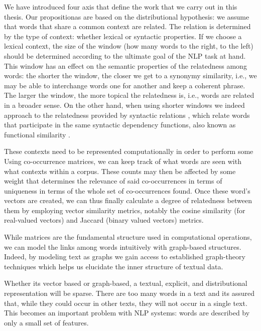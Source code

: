 We have introduced four axis that define the work that we carry out in this thesis. Our propositionas are based on the distributional hypothesis: we assume that words that share a common context are related. The relation is determined by the type of context: whether lexical or syntactic properties. If we choose a lexical context, the size of the window (how many words to the right, to the left) should be determined according to the ultimate goal of the NLP task at hand. This window has an effect on the semantic properties of the relatedness among words: the shorter the window, the closer we get to a synonymy similarity, i.e., we may be able to interchange words one for another and keep a coherent phrase. The larger the window, the more topical the relatedness is, i.e., words are related in a broader sense. On the other hand, when using shorter windows we indeed approach to the relatedness provided by syntactic relations \cite{sahlgren2006word}, which relate words that participate in the same syntactic dependency functions, also known as functional similarity \cite{LevyG14}. %

These contexts need to be represented computationally in order to perform some Using co-occurrence matrices, we can keep track of what words are seen with what contexts within a corpus. These counts may then be affected by some weight that determines the relevance of said co-occurrences in terms of uniqueness in terms of the whole set of co-occurrences found. Once these word's vectors are created, we can thus finally calculate a degree of relatedness between them by employing vector similarity metrics, notably the cosine similarity (for real-valued vectors) and Jaccard (binary valued vectors) metrics.

While matrices are the fundamental structure used in computational operations, we can model the links among words intuitively with graph-based structures. Indeed, by modeling text as graphs we gain access to  established graph-theory techniques which helps us elucidate the inner structure of textual data. 	

Whether its vector based or graph-based, a textual, explicit, and distributional representation will be sparse. There are too many words in a text and its assured that, while they could occur in other texts, they will not occur in a single text. This becomes an important problem with NLP systems: words are described by only a small set of features.

